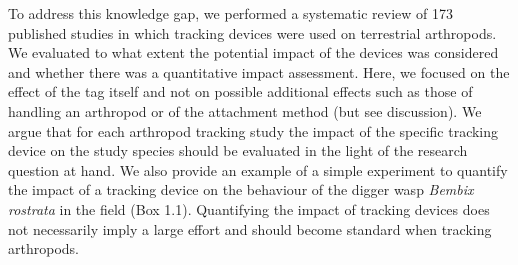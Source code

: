 \documentclass[10pt, twoside]{book} %
\begin{document}
	To address this knowledge gap, we performed a systematic review \citep{gates2002, berger-tal2019} of 173 published studies in which tracking devices were used on terrestrial arthropods. We evaluated to what extent the potential impact of the devices was considered and whether there was a quantitative impact assessment. Here, we focused on the effect of the tag itself and not on possible additional effects such as those of handling an arthropod or of the attachment method (but see discussion). We argue that for each arthropod tracking study the impact of the specific tracking device on the study species should be evaluated in the light of the research question at hand. We also provide an example of a simple experiment to quantify the impact of a tracking device on the behaviour of the digger wasp \textit{Bembix rostrata} in the field (Box 1.1). Quantifying the impact of tracking devices does not necessarily imply a large effort and should become standard when tracking arthropods.\\
	\clearpage
	\hbox{}
	\vspace*{\fill}
\end{document}
